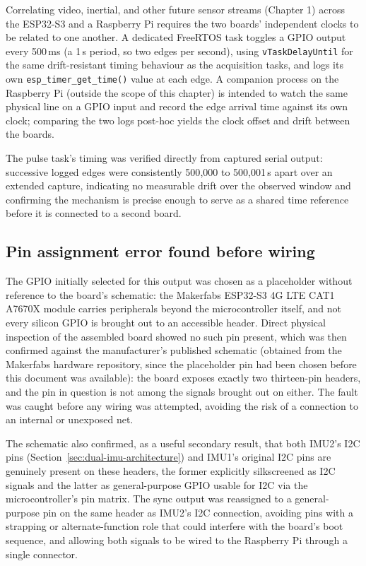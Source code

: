 Correlating video, inertial, and other future sensor streams (Chapter 1) across the ESP32-S3 and a Raspberry Pi requires the two boards' independent clocks to be related to one another. A dedicated FreeRTOS task toggles a GPIO output every 500\,ms (a 1\,s period, so two edges per second), using \texttt{vTaskDelayUntil} for the same drift-resistant timing behaviour as the acquisition tasks, and logs its own \texttt{esp\_timer\_get\_time()} value at each edge. A companion process on the Raspberry Pi (outside the scope of this chapter) is intended to watch the same physical line on a GPIO input and record the edge arrival time against its own clock; comparing the two logs post-hoc yields the clock offset and drift between the boards.

The pulse task's timing was verified directly from captured serial output: successive logged edges were consistently 500{,}000 to 500{,}001\,\textmu s apart over an extended capture, indicating no measurable drift over the observed window and confirming the mechanism is precise enough to serve as a shared time reference before it is connected to a second board.

\subsection{Pin assignment error found before wiring}

The GPIO initially selected for this output was chosen as a placeholder without reference to the board's schematic: the Makerfabs ESP32-S3 4G LTE CAT1 A7670X module carries peripherals beyond the microcontroller itself, and not every silicon GPIO is brought out to an accessible header. Direct physical inspection of the assembled board showed no such pin present, which was then confirmed against the manufacturer's published schematic (obtained from the Makerfabs hardware repository, since the placeholder pin had been chosen before this document was available): the board exposes exactly two thirteen-pin headers, and the pin in question is not among the signals brought out on either. The fault was caught before any wiring was attempted, avoiding the risk of a connection to an internal or unexposed net.

The schematic also confirmed, as a useful secondary result, that both IMU2's I2C pins (Section~\ref{sec:dual-imu-architecture}) and IMU1's original I2C pins are genuinely present on these headers, the former explicitly silkscreened as I2C signals and the latter as general-purpose GPIO usable for I2C via the microcontroller's pin matrix. The sync output was reassigned to a general-purpose pin on the same header as IMU2's I2C connection, avoiding pins with a strapping or alternate-function role that could interfere with the board's boot sequence, and allowing both signals to be wired to the Raspberry Pi through a single connector.

